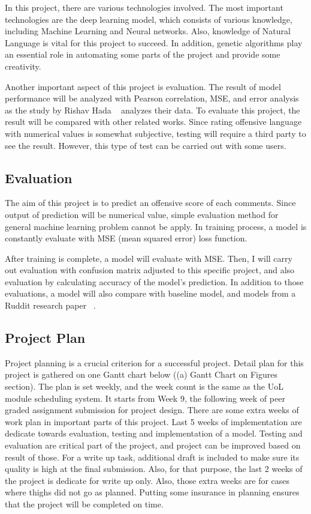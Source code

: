 \documentclass[11pt, natbib=false]{article}
\begin{document}
In this project, there are various technologies involved.
The most important technologies are the deep learning model, which consists of various knowledge, including Machine Learning and Neural networks.
Also, knowledge of Natural Language is vital for this project to succeed.
In addition, genetic algorithms play an essential role in automating some parts of the project and provide some creativity.

Another important aspect of this project is evaluation.
The result of model performance will be analyzed with Pearson correlation, MSE, and error analysis as the study by Rishav Hada ~\cite{hada2021ruddit} analyzes their data.
To evaluate this project, the result will be compared with other related works.
Since rating offensive language with numerical values is somewhat subjective, testing will require a third party to see the result.
However, this type of test can be carried out with some users. 

\subsection{Evaluation}
The aim of this project is to predict an offensive score of each comments.
Since output of prediction will be numerical value, simple evaluation method for general machine learning problem cannot be apply.
In training process, a model is constantly evaluate with MSE (mean squared error) loss function.

After training is complete, a model will evaluate with MSE.
Then, I will carry out evaluation with confusion matrix adjusted to this specific project, and also evaluation by calculating accuracy of the model’s prediction.
In addition to those evaluations, a model will also compare with baseline model, and models from a Ruddit research paper ~\cite{hada2021ruddit}.


\subsection{Project Plan}
Project planning is a crucial criterion for a successful project. Detail plan for this project is gathered on one Gantt chart below ((a) Gantt Chart on Figures section).
The plan is set weekly, and the week count is the same as the UoL module scheduling system.
It starts from Week 9, the following week of peer graded assignment submission for project design.
There are some extra weeks of work plan in important parts of this project.
Last 5 weeks of implementation are dedicate towards evaluation, testing and implementation of a model.
Testing and evaluation are critical part of the project, and project can be improved based on result of those.
For a write up task, additional draft is included to make sure its quality is high at the final submission.
Also, for that purpose, the last 2 weeks of the project is dedicate for write up only.
Also, those extra weeks are for cases where thighs did not go as planned.
Putting some insurance in planning ensures that the project will be completed on time. \\
\end{document}
